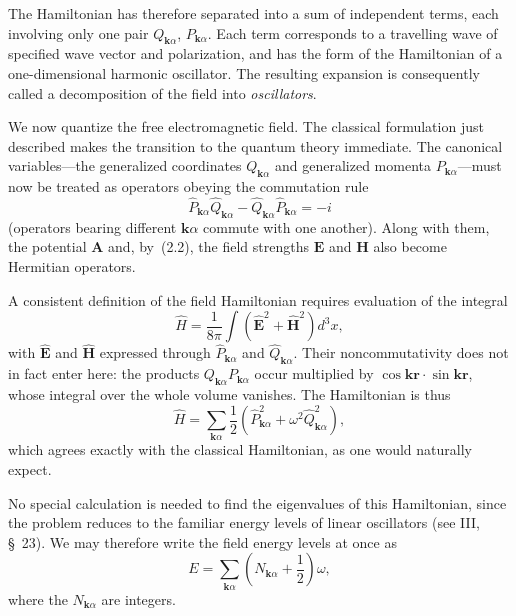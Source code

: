 The Hamiltonian has therefore separated into a sum of independent terms, each involving only one pair $Q_{\mathbf{k}\alpha}$, $P_{\mathbf{k}\alpha}$. Each term corresponds to a travelling wave of specified wave vector and polarization, and has the form of the Hamiltonian of a one-dimensional harmonic oscillator. The resulting expansion is consequently called a decomposition of the field into \emph{oscillators}.

We now quantize the free electromagnetic field. The classical formulation just described makes the transition to the quantum theory immediate. The canonical variables---the generalized coordinates $Q_{\mathbf{k}\alpha}$ and generalized momenta $P_{\mathbf{k}\alpha}$---must now be treated as operators obeying the commutation rule
\begin{equation}
\widehat{P}_{\mathbf{k}\alpha}\widehat{Q}_{\mathbf{k}\alpha}-\widehat{Q}_{\mathbf{k}\alpha}\widehat{P}_{\mathbf{k}\alpha}=-i
\tag{2.9}
\end{equation}
(operators bearing different $\mathbf{k}\alpha$ commute with one another). Along with them, the potential $\mathbf{A}$ and, by~(2.2), the field strengths $\mathbf{E}$ and $\mathbf{H}$ also become Hermitian operators.

A consistent definition of the field Hamiltonian requires evaluation of the integral
\begin{equation}
\widehat{H}=\frac{1}{8\pi}\int\left(\widehat{\mathbf{E}}^2+\widehat{\mathbf{H}}^2\right)d^3x,
\tag{2.10}
\end{equation}
with $\widehat{\mathbf{E}}$ and $\widehat{\mathbf{H}}$ expressed through $\widehat{P}_{\mathbf{k}\alpha}$ and $\widehat{Q}_{\mathbf{k}\alpha}$. Their noncommutativity does not in fact enter here: the products $Q_{\mathbf{k}\alpha}P_{\mathbf{k}\alpha}$ occur multiplied by $\cos\mathbf{kr}\cdot\sin\mathbf{kr}$, whose integral over the whole volume vanishes. The Hamiltonian is thus
\begin{equation}
\widehat{H}=\sum_{\mathbf{k}\alpha}\frac{1}{2}\left(\widehat{P}_{\mathbf{k}\alpha}^{2}+\omega^2\widehat{Q}_{\mathbf{k}\alpha}^{2}\right),
\tag{2.11}
\end{equation}
which agrees exactly with the classical Hamiltonian, as one would naturally expect.

No special calculation is needed to find the eigenvalues of this Hamiltonian, since the problem reduces to the familiar energy levels of linear oscillators (see III, \S~23). We may therefore write the field energy levels at once as
\begin{equation}
E=\sum_{\mathbf{k}\alpha}\left(N_{\mathbf{k}\alpha}+\frac{1}{2}\right)\omega,
\tag{2.12}
\end{equation}
where the $N_{\mathbf{k}\alpha}$ are integers.

